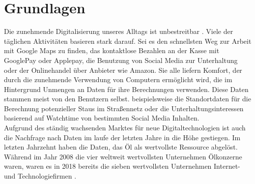 \documentclass[
	fontsize=12pt,
	headings=small,
	parskip=half,           %
	bibliography=totoc,
	numbers=noenddot,       %
	open=any,               %
]{scrreprt}
\begin{document}
\chapter{Grundlagen}
\label{chap:basics}
Die zunehmende Digitalisierung unseres Alltags ist unbestreitbar \cite{dt-digitalisierung-stat}. Viele der täglichen Aktivitäten basieren stark darauf. Sei es den schnellsten Weg zur Arbeit mit Google Maps zu finden, das kontaktlose Bezahlen an der Kasse mit GooglePay oder Applepay, die Benutzung von Social Media zur Unterhaltung oder der Onlinehandel über Anbieter wie Amazon. Sie alle liefern Komfort, der durch die zunehmende Verwendung von Computern ermöglicht wird, die im Hintergrund Unmengen an Daten für ihre Berechnungen verwenden. Diese Daten stammen meist von den Benutzern selbst. beispielsweise die Standortdaten für die Berechnung potenzieller Staus im Straßennetz \cite{dt-googlemaps-staus} oder die Unterhaltungsinteressen basierend auf Watchtime von bestimmten Social Media Inhalten. \\
Aufgrund des ständig wachsenden Marktes für neue Digitaltechnologien ist auch die Nachfrage nach Daten im laufe der letzten Jahre in die Höhe gestiegen. Im letzten Jahrzehnt haben die Daten, das Öl als wertvollste Ressource abgelöst. Während im Jahr 2008 die vier weltweit wertvollsten Unternehmen Ölkonzerne waren, waren es in 2018 bereits die sieben wertvollsten Unternehmen Internet- und Technologiefirmen \cite{dt-falck2020rohstoff}. 
\end{document}
